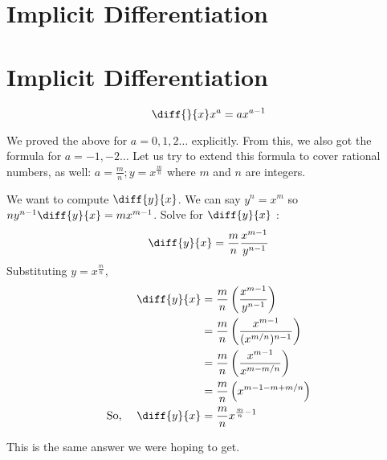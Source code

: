 

\section*{\centering Implicit Differentiation}

\bigbreak
\section{Implicit Differentiation}

$$ \diff{}{x} x^a = ax^{a-1} $$

We proved the above for $a = 0, 1, 2\ldots$ explicitly.
From this, we also got the formula for $a = -1, -2\ldots$
Let us try to extend this formula to cover rational numbers, as well:
$ a = \frac{m}{n}; y = x^{\frac{m}{n}}$ where $m$ and $n$ are integers.

We want to compute $\diff{y}{x}$. 
We can say $y^n = x^m$ so $ny^{n-1}\diff{y}{x} = mx^{m-1}$.
Solve for $\diff{y}{x}$ :
$$ \diff{y}{x} = \frac{m}{n} \frac{x^{m-1}}{y^{n-1}} $$
Substituting $y = x^{\frac{m}{n}}$,
\begin{equation*}
\begin{split}
	\diff{y}{x} & = \frac{m}{n} \left( \frac{x^{m-1}}{y^{n-1}} \right) \\
		& = \frac{m}{n} \left( \frac{x^{m-1}}{(x^{m/n})^{n-1}} \right) \\
		& = \frac{m}{n} \left( \frac{x^{m-1}}{x^{m-m/n}} \right) \\
		& = \frac{m}{n} \left( x^{m - 1 - m + m/n} \right) \\
\text{So, } \quad \diff{y}{x} & = \frac{m}{n} x^{\frac{m}{n} - 1} \\
\end{split}
\end{equation*}

This is the same answer we were hoping to get.